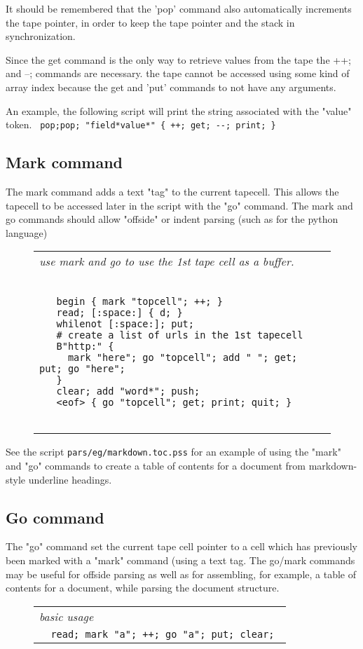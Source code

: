 \documentclass[a4paper,12pt]{article}
\begin{document}
 It should be remembered that the 'pop' command also automatically
 increments the tape pointer, in order to keep the tape pointer
 and the stack in synchronization.

 Since the get command is the only way to retrieve values from
 the tape the ++; and --; commands are necessary. the tape
 cannot be accessed using some kind of array index because
 the get and 'put' commands to not have any arguments.

 An example, the following script will print the string associated
 with the "value" token. 
 \verb| pop;pop; "field*value*" { ++; get; --; print; } |


\subsection{Mark command}
 
 The mark command adds a text "tag" to the current tapecell.
 This allows the tapecell to be accessed later in the script with
 the "go" command. The mark and go commands should allow "offside"
 or indent parsing (such as for the python language)
 \begin{figure}
 \begin{tabular}{ l }
 \emph{ use mark and go to use the 1st tape cell as a buffer. } \\ 
 \begin{lstlisting}[breaklines] 

   begin { mark "topcell"; ++; }
   read; [:space:] { d; }
   whilenot [:space:]; put; 
   # create a list of urls in the 1st tapecell
   B"http:" {
     mark "here"; go "topcell"; add " "; get; put; go "here";
   }
   clear; add "word*"; push; 
   <eof> { go "topcell"; get; print; quit; }
 
 \end{lstlisting} 
 \end{tabular} 

 \end{figure}

 See the script \texttt{pars/eg/markdown.toc.pss} for an example of using
 the "mark" and "go" commands to create a table of contents for
 a document from markdown-style underline headings.

\subsection{Go command}

  The "go" command set the current tape cell pointer to a cell
  which has previously been marked with a "mark" command (using
  a text tag. The go/mark commands may be useful for offside
  parsing as well as for assembling, for example, a table of contents
  for a document, while parsing the document structure.
 \begin{figure}
 \begin{tabular}{ l }
 \emph{ basic usage } \\ 
 \verb|  read; mark "a"; ++; go "a"; put; clear; |
 \end{tabular} 
 \end{figure}
\end{document}
